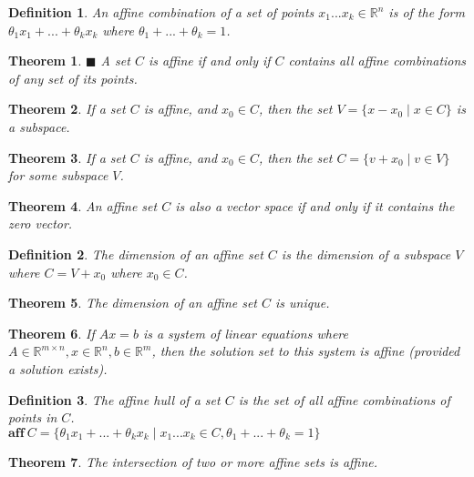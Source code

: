 \documentclass[a4paper]{article}
\newtheorem{mytheorem}{Theorem}
\newtheorem{mydef}{Definition}
\numberwithin{mytheorem}{section}
\numberwithin{mydef}{section}
\numberwithin{example}{section}
\newcommand{\done}{$\blacksquare$ }
\begin{document}
\begin{mydef} An affine combination of a set of points $x_{1}...x_{k} \in \mathbb{R}^{n}$ is of the form $\theta_{1}x_{1} + ... + \theta_{k}x_{k}$ where $\theta_{1} + ... + \theta_{k} = 1$.
\end{mydef}

\begin{mytheorem} \done A set $C$ is affine if and only if $C$ contains all affine combinations of any set of its points. \end{mytheorem}

\begin{mytheorem} If a set $C$ is affine, and $x_{0} \in C$, then the set $V = \{ x - x_{0} \mid x \in C \}$ is a subspace.  \end{mytheorem}

\begin{mytheorem} If a set $C$ is affine, and $x_{0} \in C$, then the set $C = \{ v + x_{0} \mid v \in V \}$ for some subspace $V$.  \end{mytheorem}

\begin{mytheorem} An affine set $C$ is also a vector space if and only if it contains the zero vector.  \end{mytheorem}

\begin{mydef} The dimension of an affine set $C$ is the dimension of a subspace $V$ where $C = V + x_{0}$ where $x_{0} \in C$. \end{mydef}

\begin{mytheorem} The dimension of an affine set $C$ is unique. \end{mytheorem}

\begin{mytheorem} If $Ax = b$ is a system of linear equations where $A \in \mathbb{R}^{m \times n}, x \in \mathbb{R}^{n}, b \in \mathbb{R}^{m}$, then the solution set to this system is affine (provided a solution exists). \end{mytheorem}

\begin{mydef} The affine hull of a set $C$ is the set of all affine combinations of points in $C$. \\
$\textbf{aff} \ C = \{ \theta_{1}x_{1} + ... + \theta_{k}x_{k} \mid x_{1}...x_{k} \in C, \theta_{1} + ... + \theta_{k} = 1  \}$ \end{mydef}

\begin{mytheorem} The intersection of two or more affine sets is affine. \end{mytheorem}
\end{document}

